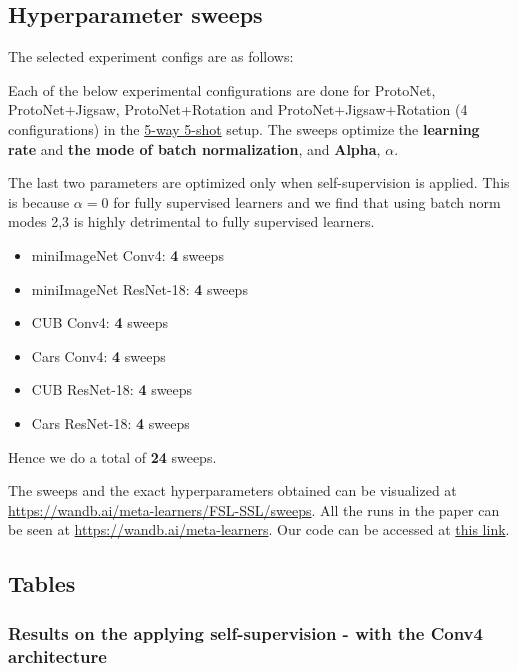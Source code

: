 \subsection{Hyperparameter sweeps}

The selected experiment configs are as follows:

Each of the below experimental configurations are done for ProtoNet, ProtoNet+Jigsaw, ProtoNet+Rotation and ProtoNet+Jigsaw+Rotation (4 configurations) in the \underline{5-way 5-shot} setup. The sweeps optimize the \textbf{learning rate} and \textbf{the mode of batch normalization}, and \textbf{Alpha}, $\alpha$. 

The last two parameters are optimized only when self-supervision is applied. This is because $\alpha=0$ for fully supervised learners and we find that using batch norm modes 2,3 is highly detrimental to fully supervised learners.

\begin{itemize}
\item miniImageNet Conv4: \textbf{4} sweeps
\item miniImageNet ResNet-18: \textbf{4} sweeps  
\item CUB Conv4: \textbf{4} sweeps
\item Cars Conv4: \textbf{4} sweeps
\item CUB ResNet-18: \textbf{4} sweeps
\item Cars ResNet-18: \textbf{4} sweeps
\end{itemize}

Hence we do a total of \textbf{24} sweeps.

The sweeps and the exact hyperparameters obtained can be visualized at \url{https://wandb.ai/meta-learners/FSL-SSL/sweeps}. All the runs in the paper can be seen at \url{https://wandb.ai/meta-learners}. Our code can be accessed at \href{https://github.com/ashok-arjun/MLRC-2021-Few-Shot-Learning-And-Self-Supervision}{this link}.


\subsection{Tables}

\subsubsection{Results on the applying self-supervision - with the Conv4 architecture}


